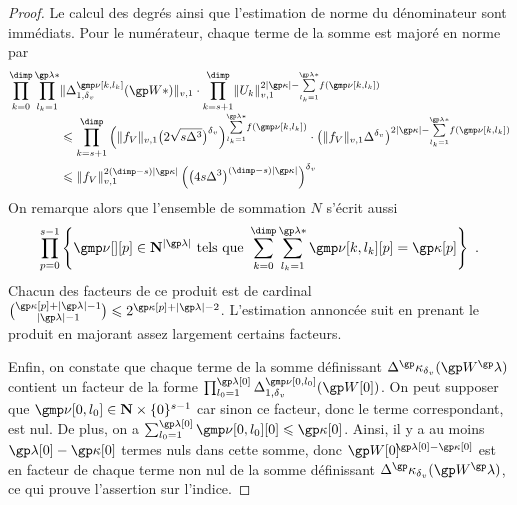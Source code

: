 \begin{proof}
  Le calcul des degrés ainsi que l'estimation de norme du dénominateur sont
  immédiats. Pour le numérateur, chaque terme de la somme est majoré en norme
  par
  \begin{align}
    \prod\indrange
    \prod_{ \indi_\ind = 1 }^{ \ip* }
    &
    \nv1{ \pmnum^\indl_{1, \dv}( \anyvp* ) }
    \cdot
    \prod_{\ind = \anydim + 1}^{\dimp}
    \nv1{ \pden_\ind }^{ 2\lgr\derp
      - \smash{ \sum\limits_{\indi_\ind = 1}^{\ip*} } f(\indl) }
    \\ & \le
    \prod_{\ind = \anydim + 1}^{\dimp}
    \left(
      \nv1{ \chow\anyvar }
      \bigl( 2 \sqrt{\anydim \anydeg^{3}} \bigr)^\dv
    \right)^{ \smash{ \sum\limits_{\indi_\ind = 1}^{\ip*} } f(\indl) }
    \cdot \left(
      \nv1{ \chow\anyvar } \anydeg^\dv
    \right)^{ 2\lgr\derp
      - \smash{ \sum\limits_{\indi_\ind = 1}^{\ip*} } f(\indl) }
    \\ & \le
    \nv1{ \chow\anyvar }^{2 (\dimp - \anydim) \lgr\derp}
    \left(
    \bigl( 4 \anydim \anydeg^{3} \bigr)^{(\dimp - \anydim) \lgr\derp}
    \right)^\dv
  \end{align}
  On remarque alors que l'ensemble de sommation \( N \) s'écrit aussi
  \begin{equation}
    \prod_{p = 0}^{\anydim - 1} \left\{
      \gmp\nu[][p] \in \N^{\lgr\ip}
      \text{ tels que }
      \sum\indrange \sum_{\indi_\ind = 1}^{\ip*}
      \gmp\nu[\ind, \indi_\ind][p]
      = \derp[p]
    \right\}
    \pmm.
  \end{equation}
  Chacun des facteurs de ce produit est de cardinal
  \(
    \binom{ \derp[p] + \lgr\ip - 1 }{ \lgr\ip - 1 }
    \le
    2^{ \derp[p] + \lgr\ip - 2 }
  \).
  L'estimation annoncée suit en prenant le produit en majorant assez largement
  certains facteurs.

  Enfin, on constate que chaque terme de la somme définissant
  \( \pmnum^\derp_\dv ( \anyvp^\ip ) \) contient un facteur de la forme
  \(
    \prod_{\indi_0 = 1}^{\ip[0]}
    \pmnum_{1, \dv}^{\gmp\nu[0, \indi_0]}( \anyvp[0] )
  \). On peut supposer que \( \gmp\nu[0, \indi_0] \in \N \times
    \set{0}^{\anydim-1} \) car sinon ce facteur, donc le terme correspondant,
  est nul. De plus, on a \( \sum_{\indi_0 = 1}^{\ip[0]} \gmp\nu[0, \indi_0][0]
    \le \derp[0] \). Ainsi, il y a au moins \( \ip[0] - \derp[0] \) termes
  nuls dans cette somme, donc \( \anyvp[0]^{\!\!\ip[0] - \derp[0]} \) est en
  facteur de chaque terme non nul de la somme définissant \( \pmnum^\derp_\dv
    ( \anyvp^\ip ) \), ce qui prouve l'assertion sur l'indice.
\end{proof}

